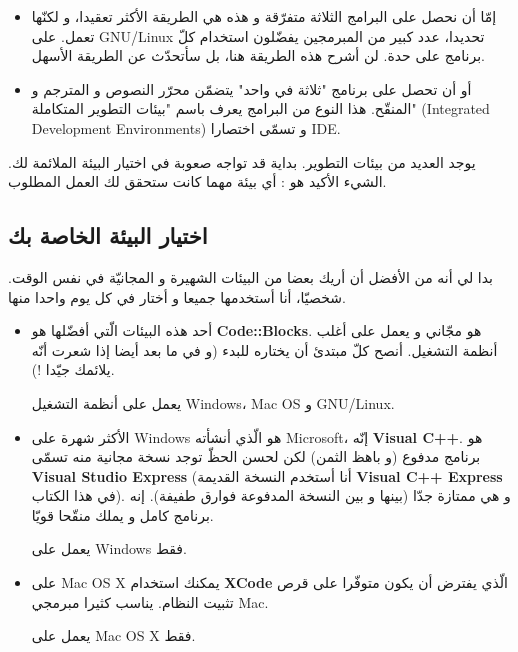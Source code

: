 \begin{itemize}
  \item إمّا أن نحصل على البرامج الثلاثة متفرّقة و هذه هي الطريقة الأكثر تعقيدا، و لكنّها تعمل. على
\textenglish{GNU/Linux}
تحديدا، عدد كبير من المبرمجين يفضّلون استخدام كلّ برنامج على حدة. لن أشرح هذه الطريقة هنا، بل سأتحدّث عن الطريقة الأسهل.
  \item أو أن تحصل على برنامج "ثلاثة في واحد" يتضمّن محرّر النصوص و المترجم و المنقّح. هذا النوع من البرامج يعرف باسم "بيئات التطوير المتكاملة"
(\textenglish{Integrated Development Environments})
و تسمّى اختصارا
\textenglish{IDE}.
\end{itemize}

يوجد العديد من بيئات التطوير. بداية قد تواجه صعوبة في اختيار البيئة الملائمة لك. الشيء الأكيد هو : أي بيئة مهما كانت ستحقق لك العمل المطلوب.

\subsection{اختيار البيئة الخاصة بك}

بدا لي أنه من الأفضل أن أريك بعضا من البيئات الشهيرة و المجانيّة في نفس الوقت. شخصيّا، أنا أستخدمها جميعا و أختار في كل يوم  واحدا منها.

\begin{itemize}
  \item أحد هذه البيئات الّتي أفضّلها هو
\textbf{\textenglish{Code::Blocks}}.
هو مجّاني و يعمل على أغلب أنظمة التشغيل. أنصح كلّ مبتدئ أن يختاره للبدء (و في ما بعد أيضا إذا شعرت أنّه يلائمك جيّدا !).

يعمل على أنظمة التشغيل
\textenglish{Windows}،
\textenglish{Mac OS}
و
\textenglish{GNU/Linux}.
  \item الأكثر شهرة على
\textenglish{Windows}
هو الّذي أنشأته
\textenglish{Microsoft}،
إنّه
\textbf{\textenglish{Visual C++}}.
هو برنامج مدفوع (و باهظ الثمن) لكن لحسن الحظّ توجد نسخة مجانية منه تسمّى
\textbf{\textenglish{Visual Studio Express}}
(أنا أستخدم النسخة القديمة
\textbf{\textenglish{Visual C++ Express}}
في هذا الكتاب). و هي ممتازة جدّا (بينها و بين النسخة المدفوعة فوارق طفيفة). إنه برنامج كامل و يملك منقّحا قويّا.

يعمل على
\textenglish{Windows}
فقط.
  \item على
\textenglish{Mac OS X}
يمكنك استخدام
\textbf{\textenglish{XCode}}
الّذي يفترض أن يكون متوفّرا على قرص تثبيت النظام. يناسب كثيرا مبرمجي
\textenglish{Mac}.

يعمل على
\textenglish{Mac OS X}
فقط.
\end{itemize}

